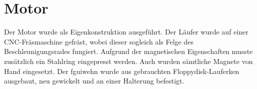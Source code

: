 \section{Motor}
Der Motor wurde als Eigenkonstruktion ausgeführt. Der Läufer wurde auf einer 
CNC-Fräsmaschine gefräst, wobei dieser sogleich als Felge des 
Beschleunigungsrades fungiert. Aufgrund der magnetischen Eigenschaften musste 
zusätzlich ein Stahlring eingepresst werden. Auch wurden sämtliche Magnete von 
Hand eingesetzt. Der fguiwehn wurde aus gebrauchten Floppydisk-Lauferken 
ausgebaut, neu gewickelt und an einer Halterung befestigt.
